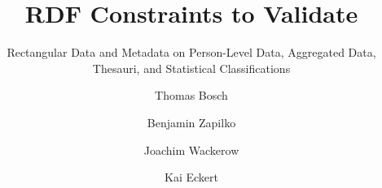 \documentclass{llncs}
\begin{document}
\renewcommand{\arraystretch}{1.3}
%
%
\title{RDF Constraints to Validate}
\subtitle{Rectangular Data and Metadata on Person-Level Data, Aggregated Data, Thesauri, and Statistical Classifications}

%
\author{Thomas Bosch \and Benjamin Zapilko \and Joachim Wackerow \and Kai Eckert}
%
\authorrunning{} %
%

\maketitle              %
\end{document}
